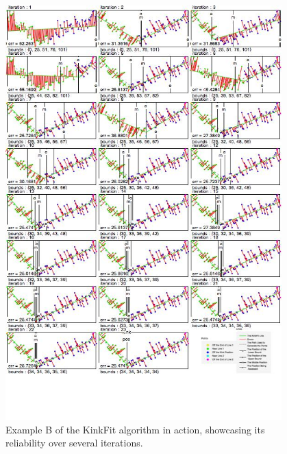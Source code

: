 \begin{figure}[h!]
  \centering
    \includegraphics[width=0.95\textwidth]{Chapter4/Figs/KinkFit_F.jpg}
    \caption{Example B of the KinkFit algorithm in action, showcasing its reliability over several iterations.}\label{fig:KinkFitF}
\end{figure}


